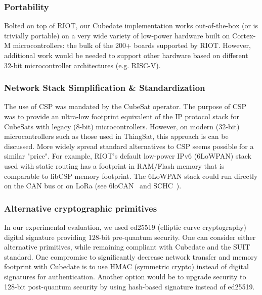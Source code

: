 \subsubsection{Portability} Bolted on top of RIOT, our Cubedate implementation works out-of-the-box
(or is trivially portable) on a very wide variety of low-power hardware built on Cortex-M microcontrollers:
the bulk of the 200+ boards supported by RIOT. However, additional work would be needed to support
other hardware based on different 32-bit microcontroller architectures (e.g. RISC-V).

\subsubsection{Network Stack Simplification \& Standardization}
The use of CSP was mandated by the CubeSat operator. The purpose of CSP was to provide an ultra-low
footprint equivalent of the IP protocol stack for CubeSats with legacy (8-bit) microcontrollers.
However, on modern (32-bit) microcontrollers such as those used in ThingSat, this approach is can be discussed.
More widely spread standard alternatives to CSP seems possible for a similar "price".
For example, RIOT's default low-power IPv6 (6LoWPAN) stack used with static routing has a footprint
in RAM/Flash memory that is comparable to libCSP memory footprint. The 6LoWPAN stack
could run directly on the CAN bus or on LoRa (see 6loCAN~\cite{wachter20206locan01}
and SCHC~\cite{rfc8724}).

\subsubsection{Alternative cryptographic primitives}
In our experimental evaluation, we used ed25519 (elliptic curve cryptography) digital signature
providing 128-bit pre-quantum security. One can consider either alternative primitives, while
remaining compliant with Cubedate and the SUIT standard. One compromise to significantly decrease
network transfer and memory footprint with Cubedate is to use HMAC (symmetric crypto) instead of
digital signatures for authentication. Another option would be to upgrade security to 128-bit
post-quantum security by using hash-based signature instead of ed25519.
